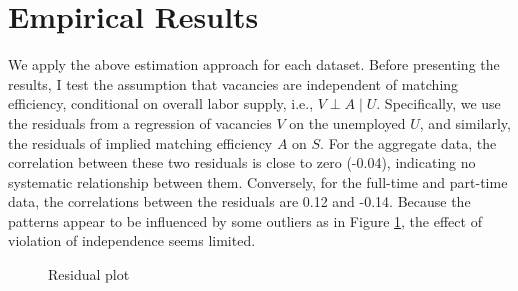 \documentclass[12pt]{article}
\begin{document}
\section{Empirical Results}
We apply the above estimation approach for each dataset.
Before presenting the results, I test the assumption that vacancies are independent of matching efficiency, conditional on overall labor supply, i.e., \( V \perp A \mid U \). 
Specifically, we use the residuals from a regression of vacancies \( V \) on the unemployed \( U \), and similarly, the residuals of implied matching efficiency \( A \) on \( S \).
For the aggregate data, the correlation between these two residuals is close to zero (-0.04), indicating no systematic relationship between them.
Conversely, for the full-time and part-time data, the correlations between the residuals are 0.12 and -0.14.
Because the patterns appear to be influenced by some outliers as in Figure \ref{fg:residual_plots}, the effect of violation of independence seems limited.


\begin{figure}[!ht]
  \begin{center}
  \caption{Residual plot}
  \label{fg:residual_plots} 
  \end{center}
  \footnotesize
\end{figure} 
\end{document}
